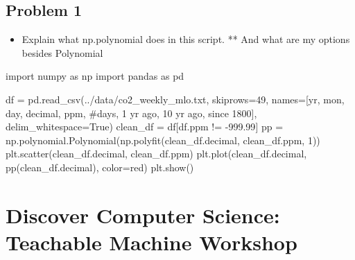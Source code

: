 \documentclass[
]{report}
\newenvironment{Shaded}{\begin{snugshade}}{\end{snugshade}}
\newcommand{\DecValTok}[1]{\textcolor[rgb]{0.68,0.00,0.00}{#1}}
\newcommand{\FloatTok}[1]{\textcolor[rgb]{0.68,0.00,0.00}{#1}}
\newcommand{\ImportTok}[1]{\textcolor[rgb]{0.00,0.46,0.62}{#1}}
\newcommand{\NormalTok}[1]{\textcolor[rgb]{0.00,0.23,0.31}{#1}}
\newcommand{\OperatorTok}[1]{\textcolor[rgb]{0.37,0.37,0.37}{#1}}
\newcommand{\StringTok}[1]{\textcolor[rgb]{0.13,0.47,0.30}{#1}}
\newcommand{\VariableTok}[1]{\textcolor[rgb]{0.07,0.07,0.07}{#1}}
\providecommand{\tightlist}{%
  \setlength{\itemsep}{0pt}\setlength{\parskip}{0pt}}\usepackage{longtable,booktabs,array}
\begin{document}
\hypertarget{problem-1}{%
\subsection{Problem 1}\label{problem-1}}

\begin{itemize}
\tightlist
\item
  Explain what np.polynomial does in this script. ** And what are my
  options besides Polynomial
\end{itemize}

\begin{Shaded}
\begin{Highlighting}[]
\ImportTok{import}\NormalTok{ numpy }\ImportTok{as}\NormalTok{ np}
\ImportTok{import}\NormalTok{ pandas }\ImportTok{as}\NormalTok{ pd}

\NormalTok{df }\OperatorTok{=}\NormalTok{ pd.read\_csv(}\StringTok{\textquotesingle{}../data/co2\_weekly\_mlo.txt\textquotesingle{}}\NormalTok{, skiprows}\OperatorTok{=}\DecValTok{49}\NormalTok{,}
\NormalTok{                     names}\OperatorTok{=}\NormalTok{[}\StringTok{\textquotesingle{}yr\textquotesingle{}}\NormalTok{, }\StringTok{\textquotesingle{}mon\textquotesingle{}}\NormalTok{, }\StringTok{\textquotesingle{}day\textquotesingle{}}\NormalTok{, }\StringTok{\textquotesingle{}decimal\textquotesingle{}}\NormalTok{, }\StringTok{\textquotesingle{}ppm\textquotesingle{}}\NormalTok{, }\StringTok{\textquotesingle{} \#days\textquotesingle{}}\NormalTok{, }\StringTok{\textquotesingle{}1 yr ago\textquotesingle{}}\NormalTok{, }\StringTok{\textquotesingle{}10 yr ago\textquotesingle{}}\NormalTok{, }\StringTok{\textquotesingle{}since 1800\textquotesingle{}}\NormalTok{],}
\NormalTok{                     delim\_whitespace}\OperatorTok{=}\VariableTok{True}\NormalTok{)}
\NormalTok{clean\_df }\OperatorTok{=}\NormalTok{ df[df.ppm }\OperatorTok{!=} \OperatorTok{{-}}\FloatTok{999.99}\NormalTok{]}
\NormalTok{pp }\OperatorTok{=}\NormalTok{ np.polynomial.Polynomial(np.polyfit(clean\_df.decimal, clean\_df.ppm, }\DecValTok{1}\NormalTok{))}
\NormalTok{plt.scatter(clean\_df.decimal, clean\_df.ppm)}
\NormalTok{plt.plot(clean\_df.decimal, pp(clean\_df.decimal), color}\OperatorTok{=}\StringTok{\textquotesingle{}red\textquotesingle{}}\NormalTok{)}
\NormalTok{plt.show()}
\end{Highlighting}
\end{Shaded}

\hypertarget{discover-computer-science-teachable-machine-workshop}{%
\section{Discover Computer Science: Teachable Machine
Workshop}\label{discover-computer-science-teachable-machine-workshop}}
\end{document}
